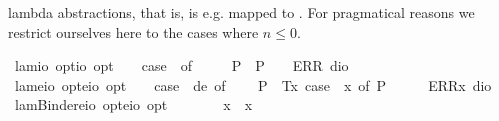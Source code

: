 \begin{isabellebody}
\begin{isamarkuptext}
 lambda abstractions, that is,  is e.g. mapped to .
 For pragmatical reasons we restrict ourselves here to the cases where $n\leq 0$.%
\end{isamarkuptext}%
\isamarkuptrue%
\isamarkupfalse%
\ lam{}{\isacharcolon}{\isacharcolon}{\isachardoublequoteopen}io\ opt{\isasymRightarrow}io\ opt{\isachardoublequoteclose}{\isacharparenleft}{\isachardoublequoteopen}\isactrlbold {\isasymlambda}\ \ {\isachardoublequoteopen}\isactrlbold {\isasymlambda}\ {\isasymequiv}\ case\ {\isasymphi}\ of\ \isanewline
\ \ \ \ P{\isacharparenleft}{\isasympsi}{\isacharparenright}\ {\isasymRightarrow}\ P{\isacharparenleft}{\isasympsi}{\isacharparenright}\ {\isacharbar}\ {\isacharunderscore}\ {\isasymRightarrow}\ ERR\ dio{\isachardoublequoteclose}\ \ \isanewline
\isanewline
{}\isamarkupfalse%
\ lam{}{\isacharcolon}{\isacharcolon}{\isachardoublequoteopen}{\isacharparenleft}e{\isasymRightarrow}io\ opt{\isacharparenright}{\isasymRightarrow}{\isacharparenleft}e{\isasymRightarrow}io{\isacharparenright}\ opt{\isachardoublequoteclose}{\isacharparenleft}{\isachardoublequoteopen}\isactrlbold {\isasymlambda}\ \ {\isachardoublequoteopen}{\isacharparenleft}\isactrlbold {\isasymlambda}\ {\isasymequiv}\ case\ {\isacharparenleft}{\isasymPhi}\ de{\isacharparenright}\ of\isanewline
\ \ \ \ P{\isacharparenleft}{\isasymphi}{\isacharparenright}\ {\isasymRightarrow}\ T{\isacharparenleft}{\isasymlambda}x{\isachardot}\ case\ {\isacharparenleft}{\isasymPhi}\ x{\isacharparenright}\ of\ P{\isacharparenleft}{\isasymphi}{\isacharparenright}\ {\isasymRightarrow}\ {\isasymphi}{\isacharparenright}\ {\isacharbar}\ {\isacharunderscore}\ {\isasymRightarrow}\ ERR{\isacharparenleft}{\isasymlambda}x{\isachardot}\ dio{\isacharparenright}{\isachardoublequoteclose}\isanewline
{}\isamarkupfalse%
\ lam{}Binder{\isacharcolon}{\isacharcolon}{\isachardoublequoteopen}{\isacharparenleft}e{\isasymRightarrow}io\ opt{\isacharparenright}{\isasymRightarrow}{\isacharparenleft}e{\isasymRightarrow}io{\isacharparenright}\ opt{\isachardoublequoteclose}\ {\isacharparenleft}\ {\isachardoublequoteopen}\isactrlbold {\isasymlambda}\ {\isacharbrackleft}{}{\isacharbrackright}\ {}{\isacharparenright}\ \ \ {\isachardoublequoteopen}\isactrlbold {\isasymlambda}\ x{\isachardot}\ {\isasymphi}\ x\ {\isasymequiv}\ \isactrlbold {\isasymlambda}\ {\isasymphi}{\isachardoublequoteclose}\isanewline

\end{isabellebody}
